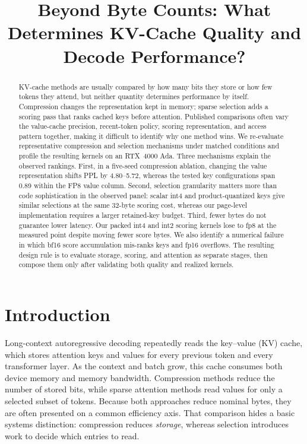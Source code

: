 \documentclass[sigplan,anonymous,review,nonacm]{acmart}
\title{Beyond Byte Counts: What Determines KV-Cache Quality and Decode Performance?}
\begin{document}
\begin{abstract}
KV-cache methods are usually compared by how many bits they store or how few tokens
they attend, but neither quantity determines performance by itself. Compression
changes the representation kept in memory; sparse selection adds a scoring pass that
ranks cached keys before attention. Published comparisons often vary the value-cache
precision, recent-token policy, scoring representation, and access pattern together,
making it difficult to identify why one method wins. We re-evaluate representative
compression and selection mechanisms under matched conditions and profile the
resulting kernels on an RTX~4000 Ada. Three mechanisms explain the observed rankings.
First, in a five-seed compression ablation, changing the value representation shifts
PPL by 4.80--5.72, whereas the tested key configurations span 0.89 within the FP8
value column. Second, selection granularity matters more than code sophistication in
the observed panel: scalar int4 and product-quantized keys give similar selections at
the same 32-byte scoring cost, whereas our page-level implementation requires a
larger retained-key budget. Third, fewer bytes do not guarantee lower latency. Our
packed int4 and int2 scoring kernels lose to fp8 at the measured point despite moving
fewer score bytes. We also identify a numerical failure in which bf16 score
accumulation mis-ranks keys and fp16 overflows. The resulting design rule is to
evaluate storage, scoring, and attention as separate stages, then compose them only
after validating both quality and realized kernels.
\end{abstract}
\maketitle

\section{Introduction}
Long-context autoregressive decoding repeatedly reads the key--value (KV) cache, which
stores attention keys and values for every previous token and every transformer
layer. As the context and batch grow, this cache consumes both device memory and
memory bandwidth. Compression methods reduce the number of stored bits, while sparse
attention methods read values for only a selected subset of tokens. Because both
approaches reduce nominal bytes, they are often presented on a common efficiency
axis. That comparison hides a basic systems distinction: compression reduces
\emph{storage}, whereas selection introduces work to decide which entries to read.
\end{document}
